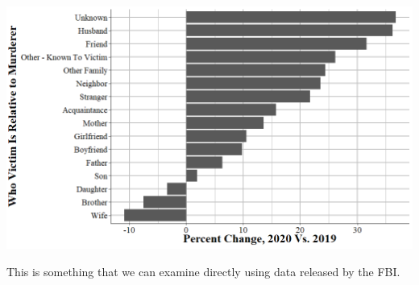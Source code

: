 \documentclass[
]{krantz}
\begin{document}
\includegraphics{images/shr_motivation_example.png}

This is something that we can examine directly using data released by the FBI.
\end{document}
